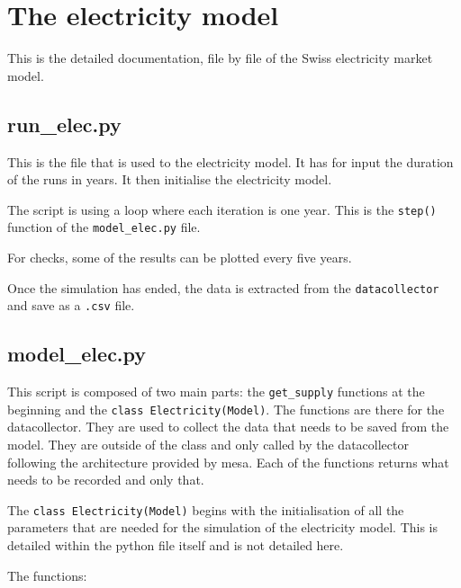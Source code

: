 \section{The electricity model}
\label{sec:}

This is the detailed documentation, file by file of the Swiss electricity market model.

\subsection{run\_elec.py}

This is the file that is used to the electricity model. It has for input the duration of the runs in years. It then initialise the electricity model.

The script is using a loop where each iteration is one year. This is the \texttt{step()} function of the \texttt{model\_elec.py} file.

For checks, some of the results can be plotted every five years.

Once the simulation has ended, the data is extracted from the \texttt{datacollector} and save as a \texttt{.csv} file.



\subsection{model\_elec.py}

This script is composed of two main parts: the \texttt{get\_supply} functions at the beginning and the \texttt{class Electricity(Model)}. The functions are there for the datacollector. They are used to collect the data that needs to be saved from the model. They are outside of the class and only called by the datacollector following the architecture provided by mesa. Each of the functions returns what needs to be recorded and only that.

The \texttt{class Electricity(Model)} begins with the initialisation of all the parameters that are needed for the simulation of the electricity model. This is detailed within the python file itself and is not detailed here.

The functions:

